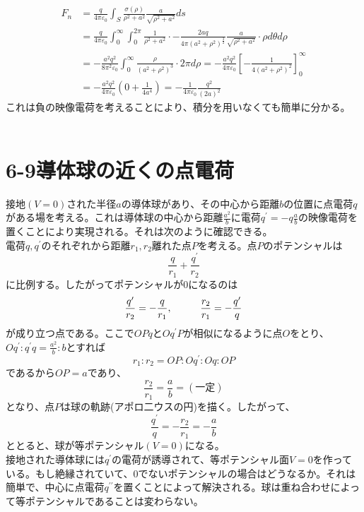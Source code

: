\documentclass{jsarticle}
\begin{document}
\begin{align}
F_{n}&=\frac{q}{4\pi\varepsilon_{0}}\int_{S}\frac{\sigma(\rho)}{\rho^{2}+a^{2}}\frac{a}{\sqrt{\rho^{2}+a^{2}}}ds\nonumber\\
&=\frac{q}{4\pi\varepsilon_{0}}\int_{0}^{\infty}\int_{0}^{2\pi}\frac{1}{\rho^{2}+a^{2}}\cdot-\frac{2aq}{4\pi(a^{2}+\rho^{2})^{\frac{3}{2}}}\frac{a}{\sqrt{\rho^{2}+a^{2}}}\cdot\rho d\theta d\rho\nonumber\\
&=-\frac{a^{2}q^{2}}{8\pi^{2}\varepsilon_{0}}\int_{0}^{\infty}\frac{\rho}{(a^{2}+\rho^2)^{3}}\cdot2\pi d\rho=-\frac{a^{2}q^{2}}{4\pi\varepsilon_{0}}\left[-\frac{1}{4(a^{2}+\rho^{2})^2}\right]_{0}^{\infty}\nonumber\\
&=-\frac{a^{2}q^{2}}{4\pi\varepsilon_{0}}\left(0+\frac{1}{4a^4}\right)=-\frac{1}{4\pi\varepsilon_{0}}\frac{q^{2}}{(2a)^2}
\end{align}
これは負の映像電荷を考えることにより、積分を用いなくても簡単に分かる。\\
\\

\newpage
\section*{6-9\hspace{5mm}導体球の近くの点電荷}
\noindent
接地\((V=0)\)された半径\(a\)の導体球があり、その中心から距離\(b\)の位置に点電荷\(q\)がある場を考える。これは導体球の中心から距離\(\displaystyle\frac{a^{2}}{b}\)に電荷\(\displaystyle q^{\prime}=-q\frac{a}{b}\)の映像電荷を置くことにより実現される。それは次のように確認できる。\\
電荷\(q,q^{\prime}\)のそれぞれから距離\(r_{1},r_{2}\)離れた点\(P\)を考える。点\(P\)のポテンシャルは
\[\frac{q}{r_{1}}+\frac{q^{\prime}}{r_{2}}\]
に比例する。したがってポテンシャルが0になるのは
\[\frac{q^{\prime}}{r_{2}}=-\frac{q}{r_{1}},\hspace{10mm}\frac{r_{2}}{r_{1}}=-\frac{q^{\prime}}{q}\]
が成り立つ点である。ここで\(OPq\)と\(Oq^{\prime}P\)が相似になるように点\(O\)をとり、\(Oq^{\prime}:q^{\prime}q=\frac{a^{2}}{b}:b\)とすれば
\[r_{1}:r_{2}=OP:Oq^{\prime}:Oq:OP\]
であるから\(OP=a\)であり、
\[\frac{r_{2}}{r_{1}}=\frac{a}{b}=(一定)\]
となり、点\(P\)は球の軌跡(アポロ二ウスの円)を描く。したがって、
\[\frac{q^{\prime}}{q}=-\frac{r_{2}}{r_{1}}=-\frac{a}{b}\]
ととると、球が等ポテンシャル\((V=0)\)になる。\\
接地された導体球には\(q^{\prime}\)の電荷が誘導されて、等ポテンシャル面\(V=0\)を作っている。もし絶縁されていて、0でないポテンシャルの場合はどうなるか。それは簡単で、中心に点電荷\(q^{\prime\prime}\)を置くことによって解決される。球は重ね合わせによって等ポテンシャルであることは変わらない。\\
\\
\end{document}
